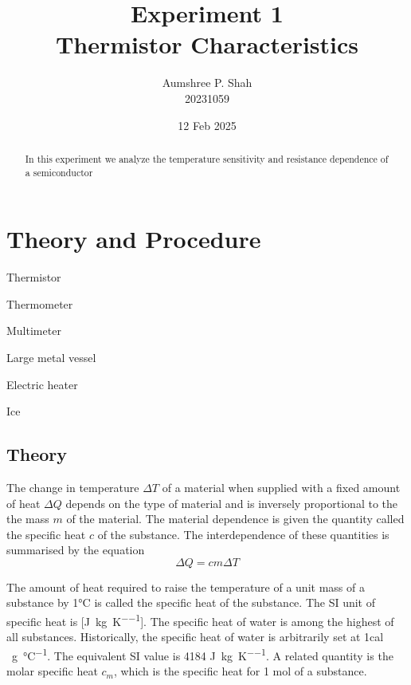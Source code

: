 \documentclass[%
 sor,
 jor,
 amsmath,amssymb,
 reprint,%
]{revtex4-2}
\begin{document}

\title{Experiment 1\\Thermistor Characteristics}

\author{Aumshree P. Shah\\20231059\color{red}}
\altaffiliation[\color{red}]{aumshree.pinkalbenshah@students.iiserpune.ac.in}
\date{12 Feb 2025}
\vspace{1cm}
\begin{abstract}
\centering
In this experiment we analyze the temperature sensitivity and resistance dependence of a semiconductor
\end{abstract}
\maketitle
\section{Theory and Procedure}

{\small
\begin{itemize}
\begin{minipage}[t]{0.45\textwidth}
    \item Thermistor
    \item Thermometer
    \item Multimeter
\end{minipage}
\hfill
\begin{minipage}[t]{0.45\textwidth}
    \item Large metal vessel 
    \item Electric heater
    \item Ice
\end{minipage}
\end{itemize}
}

\subsection{Theory}

The change in temperature $\Delta T$ of a material when supplied with a fixed amount of heat $\Delta Q$ depends
on the type of material and is inversely proportional to the the mass $m$ of the material. The material dependence
is given the quantity called the specific heat $c$ of the substance. The interdependence of these quantities is
summarised by the equation$$\Delta Q= cm \Delta T$$

The amount of heat required to raise the temperature of a unit mass of a substance by 1\si{\celsius} is called the
specific heat of the substance. The SI unit of specific heat is [\si{\joule\per\kilogram\per\kelvin}]. The specific heat of water is among the highest of all substances. Historically, the specific heat of water is arbitrarily set at 1cal \si{\per\gram\per\celsius}. The equivalent SI value is 4184 \si{\joule\per\kilogram\per\kelvin}. A related quantity is the molar specific heat $c_m$, which is the specific heat for 1  \si{\mole} of a substance. \\
\end{document}
